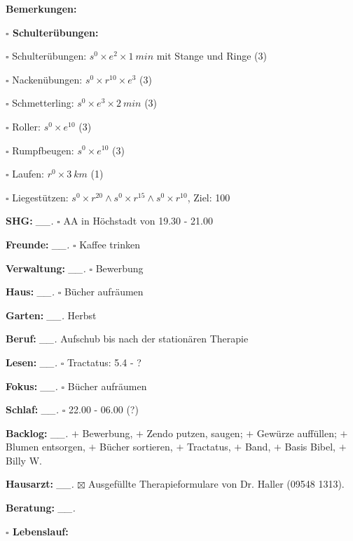 \documentclass[10pt,a4paper]{article}
\newcommand\prop[1] {{\color {alizarin} {\bf #1}}}        %
\newcommand\opti[1] {{\color {amethyst} {\bf #1}}}        %
\newcommand\mand[1] {{\color {burntorange} {\bf #1}}}     %
\newcommand\topspace{\vskip -15pt \hskip 20pt}
\newcommand\bottomspace{\vskip 4pt}
\newcommand\n[1] { {\sl #1.} \hskip 5pt }
\begin{document}
\begin{mdframed}[style=daystyle]
\begin{labeling}{{\mand {Bemerkungen:}}}
\begin{minipage}{0.75\textwidth}
\begin{labeling}{\prop {$\square$ {Schulterübungen:}}}
        \setlength\itemsep{-3pt}
      \item[$\square$ Schulterübungen:] $s^0 \times e^2 \times 1\ min$ mit Stange und Ringe (3)
      \item[$\square$ Nackenübungen:]   $s^0 \times r^{10} \times e^3$ (3)
      \item[$\square$ Schmetterling:]   $s^0 \times e^3 \times 2\ min$ (3)
      \item[$\square$ Roller:]          $s^0 \times e^{10}$ (3)
      \item[$\square$ Rumpfbeugen:]     $s^0 \times e^{10}$ (3)
      \item[$\square$ Laufen:]          $r^0 \times 3\ km$ (1)
      \item[$\square$ Liegestützen:]    $s^0 \times r^{20} \land s^0 \times r^{15} \land s^0 \times r^{10}$, Ziel: 100
      \end{labeling}
    \end{minipage}
    \bottomspace        
  \item[{\mand {SHG:}}]          \n{\_\_} $\square$ AA in Höchstadt von 19.30 - 21.00
  \item[{\mand {Freunde:}}]      \n{\_\_} $\square$ Kaffee trinken
  \item[{\mand {Verwaltung:}}]   \n{\_\_} $\square$ Bewerbung
  \item[{\mand {Haus:}}]         \n{\_\_} $\square$ Bücher aufräumen
  \item[{\mand {Garten:}}]       \n{\_\_} Herbst
  \item[{\mand {Beruf:}}]        \n{\_\_} Aufschub bis nach der stationären Therapie
  \item[{\mand {Lesen:}}]        \n{\_\_} $\square$ Tractatus: 5.4 - ?
  \item[{\mand {Fokus:}}]        \n{\_\_} $\square$ Bücher aufräumen
  \item[{\mand {Schlaf:}}]       \n{\_\_} $\square$ 22.00 - 06.00 (?)
  \item[{\mand {Backlog:}}]      \n{\_\_} 
    $+$ Bewerbung,
    $+$ Zendo putzen, saugen; $+$ Gewürze auffüllen; $+$ Blumen entsorgen, $+$ Bücher sortieren,
    $+$ Tractatus, $+$ Band, $+$ Basis Bibel, $+$ Billy W. 
  \item[{\opti {Hausarzt:}}]     \n{\_\_} $\boxtimes$ Ausgefüllte Therapieformulare von
    Dr. Haller (09548 1313).
  \item[{\opti {Beratung:}}]     \n{\_\_} 
    \topspace
    \begin{minipage}{0.75\textwidth}  
      \begin{labeling}{\prop {$\square$ Lebenslauf:}}

\end{labeling}
\end{minipage}
\end{labeling}
\end{mdframed}
\end{document}
